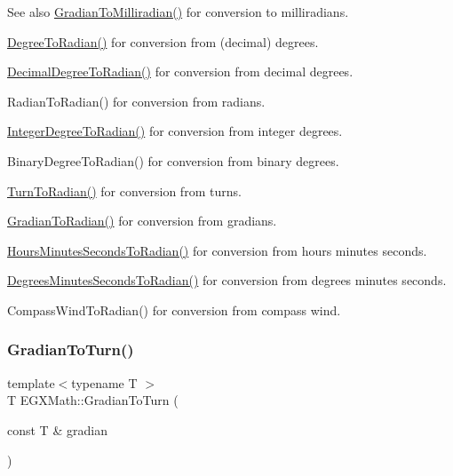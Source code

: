 \begin{DoxySeeAlso}{See also}
\mbox{\hyperlink{group___e_g_x_math-_conversions-_angle_conversions-_gradian_ga144f1019dc760268a163d81fcb3ce482}{Gradian\+To\+Milliradian()}} for conversion to milliradians. 

\mbox{\hyperlink{group___e_g_x_math-_conversions-_angle_conversions-_degree_ga48585541b228c852c9d08a9eac3682f0}{Degree\+To\+Radian()}} for conversion from (decimal) degrees. 

\mbox{\hyperlink{group___e_g_x_math-_conversions-_angle_conversions-_decimal_degree_ga906ee2c83cdf4caa59eb613dc2d5d52a}{Decimal\+Degree\+To\+Radian()}} for conversion from decimal degrees. 

Radian\+To\+Radian() for conversion from radians. 

\mbox{\hyperlink{group___e_g_x_math-_conversions-_angle_conversions-_integer_degree_ga05d3368b00ea27b9895de2ffe5c8df38}{Integer\+Degree\+To\+Radian()}} for conversion from integer degrees. 

Binary\+Degree\+To\+Radian() for conversion from binary degrees. 

\mbox{\hyperlink{group___e_g_x_math-_conversions-_angle_conversions-_turn_ga72e6d3c46ebfc25f7be5050136d8df16}{Turn\+To\+Radian()}} for conversion from turns. 

\mbox{\hyperlink{group___e_g_x_math-_conversions-_angle_conversions-_gradian_ga7ea0a6f47a672715b960181606c8fd7b}{Gradian\+To\+Radian()}} for conversion from gradians. 

\mbox{\hyperlink{group___e_g_x_math-_conversions-_angle_conversions-_hours_minutes_seconds_gaa0b04e9012ec739df1464298971e3be7}{Hours\+Minutes\+Seconds\+To\+Radian()}} for conversion from hours minutes seconds. 

\mbox{\hyperlink{group___e_g_x_math-_conversions-_angle_conversions-_degrees_minutes_seconds_ga6c99d7a2a1646b3d9c8d40cd7f083aa4}{Degrees\+Minutes\+Seconds\+To\+Radian()}} for conversion from degrees minutes seconds. 

Compass\+Wind\+To\+Radian() for conversion from compass wind. 
\end{DoxySeeAlso}
\mbox{\label{group___e_g_x_math-_conversions-_angle_conversions-_gradian_ga11b42138910d26474f47c0a2043911c9}} 
\subsubsection{\texorpdfstring{Gradian\+To\+Turn()}{GradianToTurn()}}
{\footnotesize\ttfamily template$<$typename T $>$ \\
T E\+G\+X\+Math\+::\+Gradian\+To\+Turn (\begin{DoxyParamCaption}\item[{const T \&}]{gradian }\end{DoxyParamCaption})}



